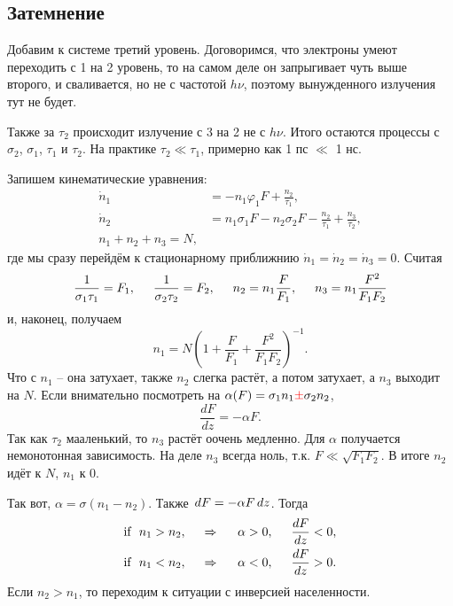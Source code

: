 \subsection{Затемнение}

Добавим к системе третий уровень. Договоримся, что электроны умеют переходить с 1 на 2 уровень, то на самом деле он запрыгивает чуть выше второго, и сваливается, но не с частотой $h \nu$, поэтому вынужденного излучения тут не будет. 

Также за $\tau_2$ происходит излучение с 3 на 2 не с $h \nu$. Итого остаются процессы с $\sigma_2$, $\sigma_1$, $\tau_1$ и $\tau_2$. На практике $\tau_2 \ll \tau_1$, примерно как 1 пс $\ll$ 1 нс.

Запишем кинематические уравнения:
\begin{align*}
    \dot{n}_1 &= - n_1 \varphi_1 F +  \frac{n_2}{\tau_1}, \\
    \dot{n}_2 &= n_1 \sigma_1 F - n_2 \sigma_2 F - \frac{n_2}{\tau_1} + \frac{n_3}{\tau_2}, \\
    n_1 + n_2 + n_3 = N,
\end{align*}
где мы сразу перейдём к стационарному приближнию $\dot{n}_1 = \dot{n}_2 = \dot{n}_3 = 0$. 
Считая
\begin{equation*}
    \frac{1}{\sigma_1 \tau_1} = F_1, \hspace{5 mm} 
    \frac{1}{\sigma_2 \tau_2} = F_2, \hspace{5 mm}
    n_2 = n_1 \frac{F}{F_1}, \hspace{5 mm}
    n_3 = n_1 \frac{F^2}{F_1 F_2}
\end{equation*}
и, наконец, получаем
\begin{equation}
    n_1 = N \left(
        1 + \frac{F}{F_1} + \frac{F^2}{F_1 F_2}
    \right)^{-1}.
\end{equation}
Что с $n_1$ -- она затухает, также $n_2$ слегка растёт, а потом затухает, а $n_3$ выходит на $N$. 
Если внимательно посмотреть на $\alpha (F) = \sigma_1 n_1 \textcolor{red}{\pm} \sigma_2 n_2$,
\begin{equation*}
    \frac{d F}{d z} = - \alpha F.
\end{equation*}
Так как $\tau_2$ мааленький, то $n_3$ растёт оочень медленно. Для $\alpha$ получается немонотонная зависимость. 
На деле $n_3$ всегда ноль, т.к. $F \ll \sqrt{F_1 F_2}$. В итоге $n_2$ идёт к $N$, $n_1$ к 0. 

Так вот, $\alpha = \sigma (n_1 - n_2)$. Также $\, d F = - \alpha F \, d z$. Тогда
\begin{align*}
    \textnormal{if} \ \ n_1 > n_2,
    \hspace{0.5cm} \Rightarrow \hspace{0.5cm}
    \alpha > 0, \hspace{5 mm} \frac{d F}{d z} < 0, \\
    \textnormal{if} \ \ n_1 < n_2,
    \hspace{0.5cm} \Rightarrow \hspace{0.5cm}
    \alpha < 0, \hspace{5 mm} \frac{d F}{d z} > 0.
\end{align*}
Если $n_2 > n_1$, то переходим к ситуации с инверсией населенности. 

